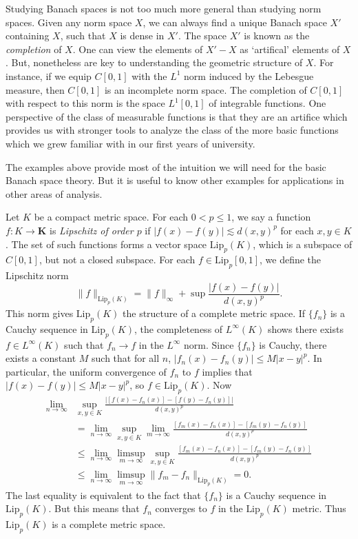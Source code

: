 \begin{remark}
    Studying Banach spaces is not too much more general than studying norm spaces. Given any norm space $X$, we can always find a unique Banach space $X'$ containing $X$, such that $X$ is dense in $X'$. The space $X'$ is known as the {\it completion} of $X$. One can view the elements of $X' - X$ as `artifical' elements of $X$. But, nonetheless are key to understanding the geometric structure of $X$. For instance, if we equip $C[0,1]$ with the $L^1$ norm induced by the Lebesgue measure, then $C[0,1]$ is an incomplete norm space. The completion of $C[0,1]$ with respect to this norm is the space $L^1[0,1]$ of integrable functions. One perspective of the class of measurable functions is that they are an artifice which provides us with stronger tools to analyze the class of the more basic functions which we grew familiar with in our first years of university.
\end{remark}

The examples above provide most of the intuition we will need for the basic Banach space theory. But it is useful to know other examples for applications in other areas of analysis.

\begin{example}
    Let $K$ be a compact metric space. For each $0 < p \leq 1$, we say a function $f: K \to \mathbf{K}$ is {\it Lipschitz of order $p$} if $|f(x) - f(y)| \lesssim d(x,y)^p$ for each $x,y \in K$. The set of such functions forms a vector space $\text{Lip}_p(K)$, which is a subspace of $C[0,1]$, but not a closed subspace. For each $f \in \text{Lip}_p [0,1]$, we define the Lipschitz norm
    \[ \| f \|_{\text{Lip}_p(K)} = \| f \|_\infty + \sup \frac{|f(x) - f(y)|}{d(x,y)^p}. \]
    This norm gives $\text{Lip}_p(K)$ the structure of a complete metric space. If $\{ f_n \}$ is a Cauchy sequence in $\text{Lip}_p(K)$, the completeness of $L^\infty(K)$ shows there exists $f \in L^\infty(K)$ such that $f_n \to f$ in the $L^\infty$ norm. Since $\{ f_n \}$ is Cauchy,  there exists a constant $M$ such that for all $n$, $|f_n(x) - f_n(y)| \leq M |x - y|^p$. In particular, the uniform convergence of $f_n$ to $f$ implies that $|f(x) - f(y)| \leq M |x - y|^p$, so $f \in \text{Lip}_p(K)$. Now
    \begin{align*}
        \lim_{n \to \infty} &\sup_{x,y \in K} \frac{|[f(x) - f_n(x)] - [f(y) - f_n(y)]|}{d(x,y)^p}\\
        &= \lim_{n \to \infty} \sup_{x,y \in K} \lim_{m \to \infty} \frac{[f_m(x) - f_n(x)] - [f_m(y) - f_n(y)]}{d(x,y)^p}\\
        &\leq \lim_{n \to \infty} \limsup_{m \to \infty} \sup_{x,y \in K} \frac{[f_m(x) - f_n(x)] - [f_m(y) - f_n(y)]}{d(x,y)^p}\\
        &\leq \lim_{n \to \infty} \limsup_{m \to \infty} \| f_m - f_n \|_{\text{Lip}_p(K)} = 0.
    \end{align*}
    The last equality is equivalent to the fact that $\{ f_n \}$ is a Cauchy sequence in $\text{Lip}_p(K)$. But this means that $f_n$ converges to $f$ in the $\text{Lip}_p(K)$ metric. Thus $\text{Lip}_p(K)$ is a complete metric space.
\end{example}

